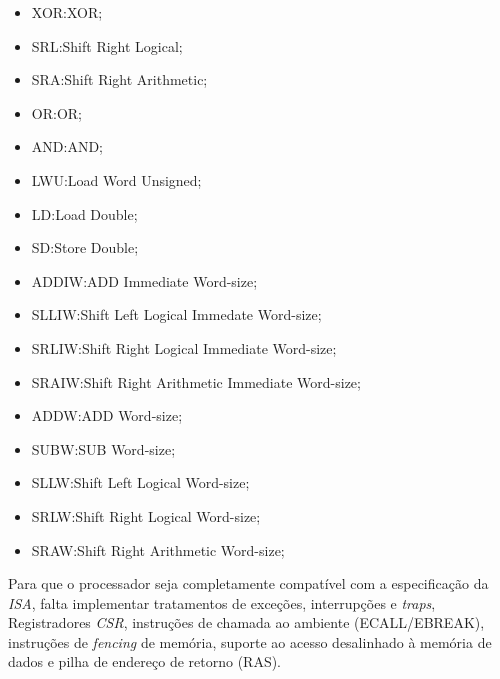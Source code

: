 \begin{itemize}[leftmargin=20mm]
    \item {XOR:\@ XOR;}
    \item {SRL:\@ Shift Right Logical;}
    \item {SRA:\@ Shift Right Arithmetic;}
    \item {OR:\@ OR;}
    \item {AND:\@ AND;}
    \item {LWU:\@ Load Word Unsigned;}
    \item {LD:\@ Load Double;}
    \item {SD:\@ Store Double;}
    \item {ADDIW:\@ ADD Immediate Word-size;}
    \item {SLLIW:\@ Shift Left Logical Immedate Word-size;}
    \item {SRLIW:\@ Shift Right Logical Immediate Word-size;}
    \item {SRAIW:\@ Shift Right Arithmetic Immediate Word-size;}
    \item {ADDW:\@ ADD Word-size;}
    \item {SUBW:\@ SUB Word-size;}
    \item {SLLW:\@ Shift Left Logical Word-size;}
    \item {SRLW:\@ Shift Right Logical Word-size;}
    \item {SRAW:\@ Shift Right Arithmetic Word-size;}
\end{itemize}

{
    Para que o processador seja completamente compatível com a
    especificação da \textit{ISA}, falta implementar tratamentos de
    exceções, interrupções e \textit{traps}, Registradores \textit{CSR},
    instruções de chamada ao ambiente (ECALL/EBREAK), instruções de
    \textit{fencing} de memória, suporte ao acesso desalinhado à memória
    de dados e pilha de endereço de retorno (RAS).
}

